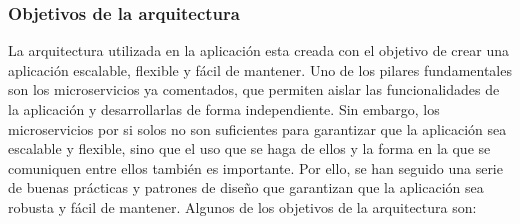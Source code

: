 \subsubsection{Objetivos de la arquitectura}
\label{subsec:diseno:ott:arquitectura_objetivos}

La arquitectura utilizada en la aplicación esta creada con el objetivo de crear una aplicación escalable, flexible y fácil de mantener.
Uno de los pilares fundamentales son los microservicios ya comentados, que permiten aislar las funcionalidades de la aplicación y
desarrollarlas de forma independiente. Sin embargo, los microservicios por si solos no son suficientes para garantizar que la 
aplicación sea escalable y flexible, sino que el uso que se haga de ellos y la forma en la que se comuniquen entre ellos también
es importante. Por ello, se han seguido una serie de buenas prácticas y patrones de diseño que garantizan que la aplicación sea
robusta y fácil de mantener. Algunos de los objetivos de la arquitectura son:

